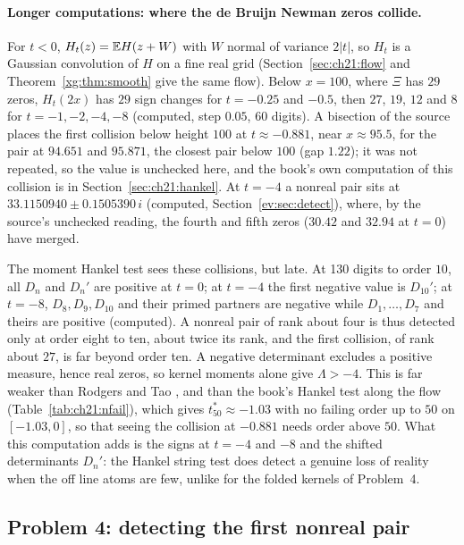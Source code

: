 \paragraph{Longer computations: where the de Bruijn Newman zeros collide.} For $t<0$, $H_t(z)=\mathbb{E} H(z+W)$ with $W$ normal of variance $2|t|$, so $H_t$ is a Gaussian convolution of $H$ on a fine real grid (Section~\ref{sec:ch21:flow} and Theorem~\ref{xg:thm:smooth} give the same flow). Below $x=100$, where $\Xi$ has $29$ zeros, $H_t(2x)$ has $29$ sign changes for $t=-0.25$ and $-0.5$, then $27$, $19$, $12$ and $8$ for $t=-1,-2,-4,-8$ (computed, step $0.05$, $60$ digits). A bisection of the source places the first collision below height $100$ at $t\approx-0.881$, near $x\approx95.5$, for the pair at $94.651$ and $95.871$, the closest pair below $100$ (gap $1.22$); it was not repeated, so the value is unchecked here, and the book's own computation of this collision is in Section~\ref{sec:ch21:hankel}. At $t=-4$ a nonreal pair sits at $33.1150940\pm0.1505390\,i$ (computed, Section~\ref{ev:sec:detect}), where, by the source's unchecked reading, the fourth and fifth zeros ($30.42$ and $32.94$ at $t=0$) have merged.

The moment Hankel test sees these collisions, but late. At 130 digits to order $10$, all $D_n$ and $D_n'$ are positive at $t=0$; at $t=-4$ the first negative value is $D_{10}'$; at $t=-8$, $D_8,D_9,D_{10}$ and their primed partners are negative while $D_1,\ldots,D_7$ and theirs are positive (computed). A nonreal pair of rank about four is thus detected only at order eight to ten, about twice its rank, and the first collision, of rank about $27$, is far beyond order ten. A negative determinant excludes a positive measure, hence real zeros, so kernel moments alone give $\Lambda>-4$. This is far weaker than Rodgers and Tao \cite{RodgersTao}, and than the book's Hankel test along the flow (Table~\ref{tab:ch21:nfail}), which gives $t^*_{50}\approx-1.03$ with no failing order up to $50$ on $[-1.03,0]$, so that seeing the collision at $-0.881$ needs order above $50$. What this computation adds is the signs at $t=-4$ and $-8$ and the shifted determinants $D_n'$: the Hankel string test does detect a genuine loss of reality when the off line atoms are few, unlike for the folded kernels of Problem~4.

\subsection{Problem 4: detecting the first nonreal pair}

